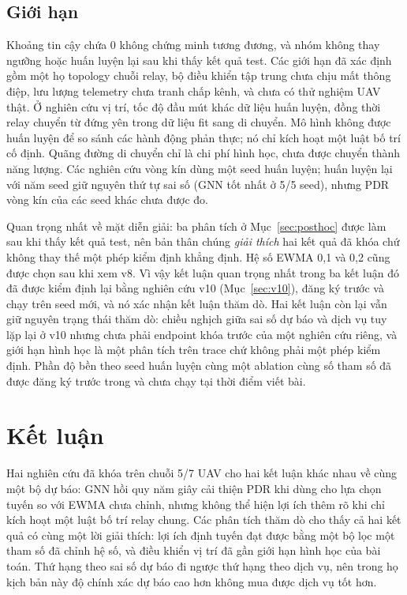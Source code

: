 \documentclass[11pt,a4paper]{article}
\newcommand{\code}[1]{\texttt{\detokenize{#1}}}
\begin{document}
\subsection{Giới hạn}
Khoảng tin cậy chứa 0 không chứng minh tương đương, và nhóm không thay ngưỡng
hoặc huấn luyện lại sau khi thấy kết quả test. Các giới hạn đã xác định gồm một
họ topology chuỗi relay, bộ điều khiển tập trung chưa chịu mất thông điệp, lưu
lượng telemetry chưa tranh chấp kênh, và chưa có thử nghiệm UAV thật. Ở nghiên
cứu vị trí, tốc độ đầu mút khác dữ liệu huấn luyện, đồng thời relay chuyển từ
đứng yên trong dữ liệu fit sang di chuyển. Mô hình không được huấn luyện để so
sánh các hành động phản thực; nó chỉ kích hoạt một luật bố trí cố định. Quãng
đường di chuyển chỉ là chi phí hình học, chưa được chuyển thành năng lượng. Các
nghiên cứu vòng kín dùng một seed huấn luyện; huấn luyện lại với năm seed giữ
nguyên thứ tự sai số (GNN tốt nhất ở 5/5 seed), nhưng PDR vòng kín của các seed
khác chưa được đo.

Quan trọng nhất về mặt diễn giải: ba phân tích ở Mục~\ref{sec:posthoc} được làm
sau khi thấy kết quả test, nên bản thân chúng \emph{giải thích} hai kết quả đã
khóa chứ không thay thế một phép kiểm định khẳng định. Hệ số EWMA 0,1 và 0,2
cũng được chọn sau khi xem v8. Vì vậy kết luận quan trọng nhất trong ba kết
luận đó đã được kiểm định lại bằng nghiên cứu v10 (Mục~\ref{sec:v10}), đăng ký
trước và chạy trên seed mới, và nó xác nhận kết luận thăm dò. Hai kết luận còn
lại vẫn giữ nguyên trạng thái thăm dò: chiều nghịch giữa sai số dự báo và dịch
vụ tuy lặp lại ở v10 nhưng chưa phải endpoint khóa trước của một nghiên cứu
riêng, và giới hạn hình học là một phân tích trên trace chứ không phải một phép
kiểm định. Phần độ bền theo seed huấn luyện cùng một ablation cùng số tham số
đã được đăng ký trước trong \code{docs/service_v11_protocol.md} và chưa chạy
tại thời điểm viết bài.
\section{Kết luận}
Hai nghiên cứu đã khóa trên chuỗi 5/7 UAV cho hai kết luận khác nhau về cùng
một bộ dự báo: GNN hồi quy năm giây cải thiện PDR khi dùng cho lựa chọn tuyến
so với EWMA chưa chỉnh, nhưng không thể hiện lợi ích thêm rõ khi chỉ kích hoạt
một luật bố trí relay chung. Các phân tích thăm dò cho thấy cả hai kết quả có
cùng một lời giải thích: lợi ích định tuyến đạt được bằng một bộ lọc một tham
số đã chỉnh hệ số, và điều khiển vị trí đã gần giới hạn hình học của bài toán.
Thứ hạng theo sai số dự báo đi ngược thứ hạng theo dịch vụ, nên trong họ kịch
bản này độ chính xác dự báo cao hơn không mua được dịch vụ tốt hơn.
\end{document}
